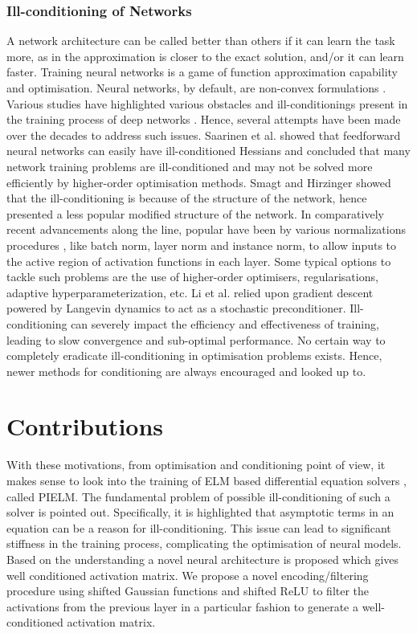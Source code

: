 \documentclass{article}
\begin{document}
\subsubsection{Ill-conditioning of Networks}
\label{illcondition}
A network architecture can be called better than others if it can learn the task more, as in the approximation is closer to the exact solution, and/or it can learn faster. Training neural networks is a game of function approximation capability and optimisation. Neural networks, by default, are non-convex formulations \cite{ergen2021revealing}. Various studies have highlighted various obstacles and ill-conditionings present in the training process of deep networks \cite{Goodfellow-et-al-2016}. Hence, several attempts have been made over the decades to address such issues. Saarinen et al. \cite{cybenko1993illconditioning} showed that feedforward neural networks can easily have ill-conditioned Hessians and concluded that many network training problems are ill-conditioned and may not be solved more efficiently by higher-order optimisation methods. Smagt and Hirzinger \cite{vanderSmagt1998} showed that the ill-conditioning is because of the structure of the network, hence presented a less popular modified structure of the network. In comparatively recent advancements along the line, popular have been by various normalizations procedures \cite{batchNorm,ba2016layer,ulyanov2016instance}, like batch norm, layer norm and instance norm, to allow inputs to the active region of activation functions in each layer.  Some typical options to tackle such problems are the use of higher-order optimisers, regularisations, adaptive hyperparameterization, etc. Li et al. \cite{li2016preconditioned} relied upon gradient descent powered by Langevin dynamics to act as a stochastic preconditioner. Ill-conditioning can severely impact the efficiency and effectiveness of training, leading to slow convergence and sub-optimal performance. No certain way to completely eradicate ill-conditioning in optimisation problems exists. Hence, newer methods for conditioning are always encouraged and looked up to. 

\section{Contributions}
\label{contribution}
With these motivations, from optimisation and conditioning point of view, it makes sense to look into the training of ELM based differential equation solvers \cite{dwivedi2020physics,rout2019numerical}, called PIELM. The fundamental problem of possible ill-conditioning of such a solver is pointed out. Specifically, it is highlighted that asymptotic terms in an equation can be a reason for ill-conditioning. This issue can lead to significant stiffness in the training process, complicating the optimisation of neural models. Based on the understanding a novel neural architecture is proposed which gives well conditioned activation matrix. We propose a novel encoding/filtering procedure using shifted Gaussian functions and shifted ReLU to filter the activations from the previous layer in a particular fashion to generate a well-conditioned activation matrix.
\end{document}

